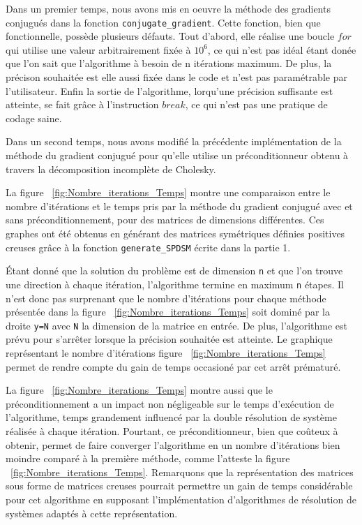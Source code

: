 \documentclass{article}
\begin{document}
Dans un premier temps, nous avons mis en oeuvre la méthode des gradients conjugués dans la fonction \texttt{conjugate\_gradient}. Cette fonction, bien que fonctionnelle, possède plusieurs défauts. Tout d'abord, elle réalise une boucle $for$ qui utilise une valeur arbitrairement fixée à ${10^{6}}$, ce qui n'est pas idéal étant donée que l'on sait que l'algorithme à besoin de n itérations maximum. De plus, la précison souhaitée est elle aussi fixée dans le code et n'est pas paramétrable par l'utilisateur. Enfin la sortie de l'algorithme, lorqu'une précision suffisante est atteinte, se fait grâce à l'instruction $break$, ce qui n'est pas une pratique de codage saine. 

Dans un second temps, nous avons modifié la précédente implémentation de la méthode du gradient conjugué pour qu'elle utilise un préconditionneur obtenu à travers la décomposition incomplète de Cholesky. 

La figure ~\ref{fig:Nombre_iterations_Temps} montre une comparaison entre le nombre d'itérations et le temps pris par la méthode du gradient conjugué avec et sans préconditionnement, pour des matrices de dimensions différentes. Ces graphes ont été obtenus en générant des matrices symétriques définies positives creuses grâce à la fonction \texttt{generate\_SPDSM} écrite dans la partie 1.

Étant donné que la solution du problème est de dimension \texttt{n} et que l'on trouve une direction à chaque itération, l'algorithme termine en maximum \texttt{n} étapes. Il n'est donc pas surprenant que le nombre d'itérations pour chaque méthode présentée dans la figure ~\ref{fig:Nombre_iterations_Temps} soit dominé par la droite \texttt{y=N} avec \texttt{N} la dimension de la matrice en entrée. De plus, l'algorithme est prévu pour s'arrêter lorsque la précision souhaitée est atteinte. Le graphique représentant le nombre d'itérations figure ~\ref{fig:Nombre_iterations_Temps} permet de rendre compte du gain de temps occasioné par cet arrêt prématuré.

La figure ~\ref{fig:Nombre_iterations_Temps} montre aussi que le préconditionnement a un impact non négligeable sur le temps d'exécution de l'algorithme, temps grandement influencé par la double résolution de système réalisée à chaque itération. Pourtant, ce préconditionneur, bien que coûteux à obtenir, permet de faire converger l'algorithme en un nombre d'itérations bien moindre comparé à la première méthode, comme l'atteste la figure ~\ref{fig:Nombre_iterations_Temps}. Remarquons que la représentation des matrices sous forme de matrices creuses pourrait permettre un gain de temps considérable pour cet algorithme en supposant l'implémentation d'algorithmes de résolution de systèmes adaptés à cette représentation.
\end{document}
